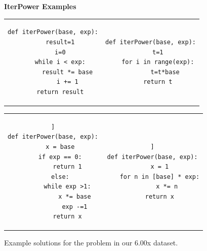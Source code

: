 \begin{figure}
{\bf IterPower Examples} \\
\begin{tabular}{cc} 
\begin{minipage}{0.4\linewidth}
\begin{lstlisting}[]
def iterPower(base, exp):
    result=1
    i=0
    while i < exp:
        result *= base
        i += 1
    return result
\end{lstlisting}
\end{minipage}
&
\begin{minipage}{0.4\linewidth}
\begin{lstlisting}[]
def iterPower(base, exp):
    t=1
    for i in range(exp):
        t=t*base
    return t
\end{lstlisting}
\end{minipage}
\\
\end{tabular}

\begin{tabular}{c c}
\begin{minipage}{0.4\linewidth}
\begin{lstlisting}]
def iterPower(base, exp):
    x = base
    if exp == 0:
        return 1
    else:
        while exp >1:
            x *= base
            exp -=1
        return x
\end{lstlisting}
\end{minipage}
&
\begin{minipage}{0.4\linewidth}
\begin{lstlisting}]
def iterPower(base, exp):
    x = 1
    for n in [base] * exp:
        x *= n
    return x
\end{lstlisting}
\end{minipage}

\end{tabular}
\caption{Example solutions for the  problem in our 6.00x dataset.}
\label{ipexamples}
\end{figure}


